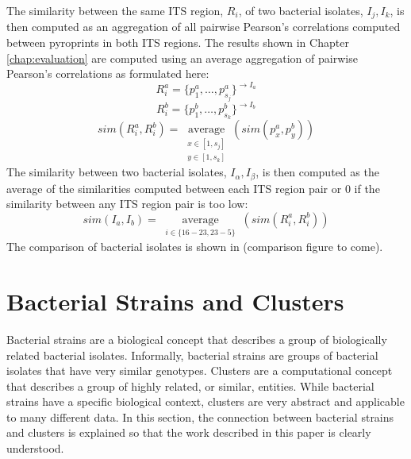 \documentclass[12pt]{ucthesis}
\begin{document}
      The similarity between the same ITS region, $R_i$, of two bacterial
      isolates, $I_j, I_k$, is then computed as an aggregation of all pairwise
      Pearson's correlations computed between pyroprints in both ITS regions.
      The results shown in Chapter \ref{chap:evaluation} are computed using an
      average aggregation of pairwise Pearson's correlations as formulated
      here:
      $$
         R_{i}^{a} = \{p_{1}^{a}, \ldots, p_{s_{j}}^{a}\}^{\rightarrow I_{a}}
      $$
      $$
         R_{i}^{b} = \{p_{1}^{b}, \ldots, p_{s_{k}}^{b}\}^{\rightarrow I_{b}}
      $$
      $$
         sim(R_{i}^{a}, R_{i}^{b}) =
         \operatorname*{average}_{\substack{x \in [1,s_{j}]\\y \in [1, s_{k}]}}
                 (sim(p_{x}^{a}, p_{y}^{b}))
      $$
      The similarity between two bacterial isolates, $I_{\alpha}, I_{\beta}$,
      is then computed as the average of the similarities computed between each
      ITS region pair or $0$ if the similarity between any ITS region pair is
      too low:
      $$
         sim(I_{a}, I_{b}) = \operatorname*{average}_{
                                 \substack{i \in \{16-23, 23-5\}}
                             } (sim(R_{i}^{a}, R_{i}^{b}))
      $$
      The comparison of bacterial isolates is shown in (comparison figure to
      come).


   \section{Bacterial Strains and Clusters}\label{sec:strains}
      Bacterial strains are a biological concept that describes a group of
      biologically related bacterial isolates. Informally, bacterial strains
      are groups of bacterial isolates that have very similar genotypes.
      Clusters are a computational concept that describes a group of highly
      related, or similar, entities. While bacterial strains have a specific
      biological context, clusters are very abstract and applicable to many
      different data. In this section, the connection between bacterial strains
      and clusters is explained so that the work described in this paper is
      clearly understood.
\end{document}
